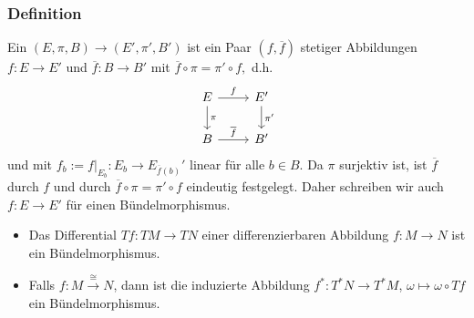 \subsubsection[Definition: Bündelmorphismus]{Definition} %
\label{ssub:432}
Ein  $(E,\pi , B) \to (E', \pi', B')$  ist ein Paar $(f, \overline{f})$ stetiger Abbildungen $f : E \to E'$ und $\overline{f} : B \to B'$ mit
\(
	\overline{f} \circ \pi  = \pi' \circ f, 
\)
d.h. 
\[
	\begin{tikzcd}
		E \rar{f} \dar{\pi }& E' \dar{\pi'}\\
		B \rar{\overline{f}}& B'
	\end{tikzcd}
\]
und mit  $f_b := f\big|_{E_b} : E_{b} \to E_{\overline{f}(b) }'$ linear für alle $b \in B$.
Da $\pi $ surjektiv ist, ist $\overline{f}$ durch $f$ und durch $\overline{f} \circ \pi = \pi' \circ f $ eindeutig festgelegt. Daher schreiben wir auch $f : E \to E'$ für
einen Bündelmorphismus.
\begin{itemize}
	\item Das Differential $T f : TM \to TN$ einer differenzierbaren Abbildung $f : M \to N$ ist ein Bündelmorphismus.
	\item Falls $f : M \xrightarrow{\cong} N$, dann ist die induzierte Abbildung $f^* : T^*N \to T^* M$, $\omega \mapsto \omega \circ Tf$ ein Bündelmorphismus.
\end{itemize}


